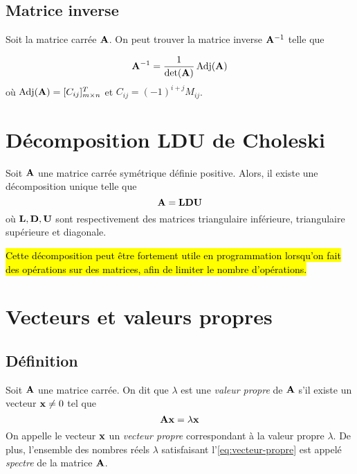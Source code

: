 \subsection{Matrice inverse}
\label{ssec:matrice-inverse}
Soit la matrice carrée $\mathbf{A}$. On peut trouver la matrice inverse $\mathbf{A}^{-1}$ telle que

\begin{equation}
\label{eq:mat-inverse}
\mathbf{A}^{-1} = \frac{1}{\det(\mathbf{A})} \operatorname{Adj}(\mathbf{A})
\end{equation}
où $\operatorname{Adj}(\mathbf{A})   = [C_{ij}]_{m \times n}^T$ et  $C_{ij}   = (-1)^{i+j} M_{ij}$.


\section{Décomposition LDU de Choleski}
Soit $\mathbf{A}$ une matrice carrée symétrique définie positive. Alors, il existe une décomposition unique telle que
\begin{equation}
\label{eq:decomp-choleski}
\mathbf{A} = \mathbf{LDU}
\end{equation}
où $\mathbf{L, D, U}$ sont respectivement des matrices triangulaire inférieure, triangulaire supérieure et diagonale.

\hl{Cette décomposition peut être fortement utile en programmation lorsqu'on fait des opérations sur des matrices, afin de limiter le nombre d'opérations.}

\section{Vecteurs et valeurs propres}
\subsection{Définition}
Soit $\mathbf{A}$ une matrice carrée. On dit que $\lambda$ est une \textit{valeur propre} de $\mathbf{A}$ s'il existe un vecteur $\mathbf{x} \neq 0$ tel que
\begin{equation}
\label{eq:vecteur-propre}
\mathbf{Ax = \lambda x}
\end{equation}
On appelle le vecteur $\mathbf{x}$ un \textit{vecteur propre} correspondant à la valeur propre $\lambda$. De plus, l'ensemble des nombres réels $\lambda$ satisfaisant l'\autoref{eq:vecteur-propre} est appelé \textit{spectre} de la matrice $\mathbf{A}$.

